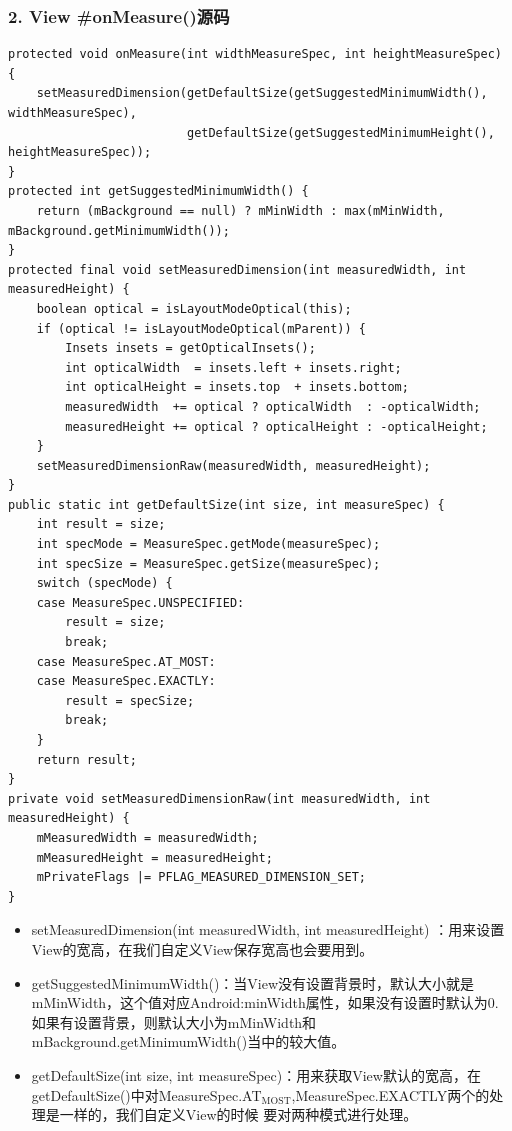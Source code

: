 \documentclass[9pt, b5paper]{article}
\begin{document}
\subsubsection{2. View \#onMeasure()源码}
\label{sec-1-4-2}
\begin{verbatim}
protected void onMeasure(int widthMeasureSpec, int heightMeasureSpec) {
    setMeasuredDimension(getDefaultSize(getSuggestedMinimumWidth(), widthMeasureSpec),
                         getDefaultSize(getSuggestedMinimumHeight(), heightMeasureSpec));
}
protected int getSuggestedMinimumWidth() {
    return (mBackground == null) ? mMinWidth : max(mMinWidth, mBackground.getMinimumWidth());
}
protected final void setMeasuredDimension(int measuredWidth, int measuredHeight) {
    boolean optical = isLayoutModeOptical(this);
    if (optical != isLayoutModeOptical(mParent)) {
        Insets insets = getOpticalInsets();
        int opticalWidth  = insets.left + insets.right;
        int opticalHeight = insets.top  + insets.bottom;
        measuredWidth  += optical ? opticalWidth  : -opticalWidth;
        measuredHeight += optical ? opticalHeight : -opticalHeight;
    }
    setMeasuredDimensionRaw(measuredWidth, measuredHeight);
}
public static int getDefaultSize(int size, int measureSpec) {
    int result = size;
    int specMode = MeasureSpec.getMode(measureSpec);
    int specSize = MeasureSpec.getSize(measureSpec);
    switch (specMode) {
    case MeasureSpec.UNSPECIFIED:
        result = size;
        break;
    case MeasureSpec.AT_MOST:
    case MeasureSpec.EXACTLY:
        result = specSize;
        break;
    }
    return result;
}
private void setMeasuredDimensionRaw(int measuredWidth, int measuredHeight) {
    mMeasuredWidth = measuredWidth;
    mMeasuredHeight = measuredHeight;
    mPrivateFlags |= PFLAG_MEASURED_DIMENSION_SET;
}
\end{verbatim}
\begin{itemize}
\item setMeasuredDimension(int measuredWidth, int measuredHeight) ：用来设置View的宽高，在我们自定义View保存宽高也会要用到。
\item getSuggestedMinimumWidth()：当View没有设置背景时，默认大小就是mMinWidth，这个值对应Android:minWidth属性，如果没有设置时默认为0. 如果有设置背景，则默认大小为mMinWidth和mBackground.getMinimumWidth()当中的较大值。
\item getDefaultSize(int size, int measureSpec)：用来获取View默认的宽高，在getDefaultSize()中对MeasureSpec.AT$_{\text{MOST}}$,MeasureSpec.EXACTLY两个的处理是一样的，我们自定义View的时候 要对两种模式进行处理。
\end{itemize}
\end{document}
